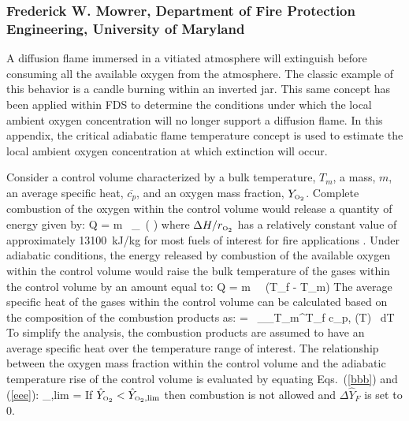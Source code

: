 \subsubsection*{Frederick W. Mowrer, Department of Fire Protection Engineering, University of Maryland}

A diffusion flame immersed in a vitiated atmosphere will extinguish before consuming all the available oxygen from the atmosphere.  The classic example of this behavior is a candle burning within an inverted jar.  This same concept has been applied within FDS to determine the conditions under which the local ambient oxygen concentration will no longer support a diffusion flame.  In this appendix, the critical adiabatic flame temperature concept is used to estimate the local ambient oxygen concentration at which extinction will occur.

Consider a control volume characterized by a bulk temperature, $T_m$, a mass, $m$, an average specific heat, $\overline{c_p}$, and an oxygen mass fraction, $Y_{\text{\tiny \hbox{O}$_2$}}$.  Complete combustion of the oxygen within the control volume would release a quantity of energy given by:
\be
   Q = m \, _\OTWO \, \left(   \right)  \label{bbb}
\ee
where $\Delta H/r_{\text{\tiny \hbox{O}$_2$}}$ has a relatively constant value of approximately 13100~kJ/kg for most fuels of interest for fire applications \cite{Huggett:1}. Under adiabatic conditions, the energy released by combustion of the available oxygen within the control volume would raise the bulk temperature of the gases within the control volume by an amount equal to:
\be
   Q = m \,  \, (T_f - T_m)  \label{eee}
\ee
The average specific heat of the gases within the control volume can be calculated based on the composition of the combustion products as:
\be
    =  \, \sum_\alpha \int_{T_m}^{T_f} c_{p,\alpha} (T) \, dT
\ee
To simplify the analysis, the combustion products are assumed to have an average specific heat over the temperature range of interest. The relationship between the oxygen mass fraction within the control volume and the adiabatic temperature rise of the control volume is evaluated by equating Eqs.~(\ref{bbb}) and (\ref{eee}):
\be
   _{\OTWO,lim} = 
\ee
If $\hat{Y}_{\text{\tiny \hbox{O}$_2$}} < \hat{Y}_{\text{\tiny \hbox{O}$_2$},\lim}$ then combustion is not allowed and  $\Delta \hat{Y}_{F}$ is set to 0.

